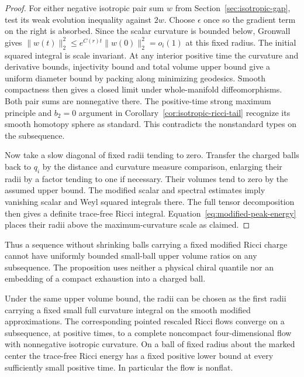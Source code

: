 \begin{proof}
For either negative isotropic pair sum \(w\) from
Section~\ref{sec:isotropic-gap}, test its weak evolution inequality
against \(2w\). Choose \(\epsilon\) once so the gradient term on
the right is absorbed. Since the scalar curvature is bounded
below, Gronwall gives
\(\|w(t)\|_2^2\le e^{C(r)t}\|w(0)\|_2^2=o_i(1)\) at this fixed
radius. The initial squared integral is scale invariant. At any
interior positive time the curvature and derivative bounds, injectivity
bound and total volume upper bound give a uniform diameter bound by packing along minimizing geodesics. Smooth compactness then gives a closed limit under
whole-manifold diffeomorphisms. Both pair sums are nonnegative there.
The positive-time strong maximum principle and \(b_2=0\) argument
in Corollary~\ref{cor:isotropic-ricci-tail} recognize its smooth
homotopy sphere as standard. This contradicts the nonstandard
types on the subsequence.

Now take a slow diagonal of fixed radii tending to zero. Transfer
the charged balls back to \(q_i\) by the distance and curvature
measure comparison, enlarging their radii by a factor tending to
one if necessary. Their volumes tend to zero by the assumed upper
bound. The modified scalar and spectral estimates imply vanishing
scalar and Weyl squared integrals there. The full tensor
decomposition then gives a definite trace-free Ricci integral.
Equation~\eqref{eq:modified-peak-energy} places their radii above
the maximum-curvature scale as claimed.
\end{proof}

Thus a sequence without shrinking balls carrying a fixed modified
Ricci charge cannot have uniformly bounded small-ball upper volume
ratios on any subsequence. The proposition uses neither a physical
chiral quantile nor an embedding of a compact exhaustion into a
charged ball.

\begin{theorem}
\label{thm:charged-modified-flow}
Under the same upper volume bound, the radii can be chosen as the
first radii carrying a fixed small full curvature integral on the
smooth modified approximations. The corresponding pointed rescaled
Ricci flows converge on a subsequence, at positive times, to a
complete noncompact four-dimensional flow with nonnegative isotropic
curvature. On a ball of fixed radius about the marked center the
trace-free Ricci energy has a fixed positive lower bound at every
sufficiently small positive time. In particular the flow is nonflat.
\end{theorem}

